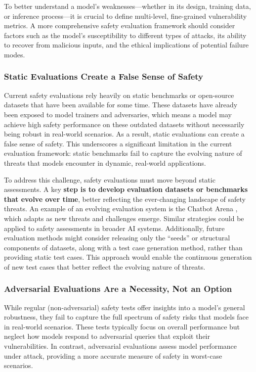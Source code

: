 To better understand a model’s weaknesses—whether in its design, training data, or inference process—it is crucial to define multi-level, fine-grained vulnerability metrics. A more  comprehensive safety evaluation framework should consider factors such as the model’s susceptibility to different types of attacks, its ability to recover from malicious inputs, and the ethical implications of potential failure modes.


\subsubsection{Static Evaluations Create a False Sense of Safety}
Current safety evaluations rely heavily on static benchmarks or open-source datasets that have been available for some time. These datasets have already been exposed to model trainers and adversaries, which means a model may achieve high safety performance on these outdated datasets without necessarily being robust in real-world scenarios. As a result, static evaluations can create a false sense of safety. This underscores a significant limitation in the current evaluation framework: static benchmarks fail to capture the evolving nature of threats that models encounter in dynamic, real-world applications.

To address this challenge, safety evaluations must move beyond static assessments. A key \textbf{step is to develop evaluation datasets or benchmarks that evolve over time}, better reflecting the ever-changing landscape of safety threats. An example of an evolving evaluation system is the Chatbot Arena \cite{chiangchatbot}, which adapts as new threats and challenges emerge. Similar strategies could be applied to safety assessments in broader AI systems.
Additionally, future evaluation methods might consider releasing only the ``seeds” or structural components of datasets, along with a test case generation method, rather than providing static test cases. This approach would enable the continuous generation of new test cases that better reflect the evolving nature of threats.


\subsubsection{Adversarial Evaluations Are a Necessity, Not an Option}

While regular (non-adversarial) safety tests offer insights into a model’s general robustness, they fail to capture the full spectrum of safety risks that models face in real-world scenarios. These tests typically focus on overall performance but neglect how models respond to adversarial queries that exploit their vulnerabilities. In contrast, adversarial evaluations assess model performance under attack, providing a more accurate measure of safety in worst-case scenarios.

